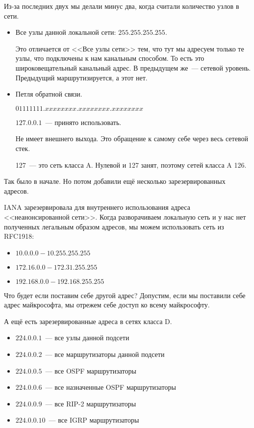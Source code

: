 Из-за последних двух мы делали минус два, когда считали количество узлов в сети.

\begin{itemize}
    \item Все узлы данной локальной сети: $255.255.255.255$.

    Это отличается от <<Все узлы сети>> тем, что тут мы адресуем только те узлы, что подключены к нам канальным способом. То есть это широковещательный канальный адрес. В предыдущем же~--- сетевой уровень. Предыдущий маршрутизируется, а этот нет.

    \item Петля обратной связи.

    $01111111.xxxxxxxx.xxxxxxxx.xxxxxxxx$

    $127.0.0.1$~--- принято использовать.

    Не имеет внешнего выхода. Это обращение к самому себе через весь сетевой стек. 

    127~--- это сеть класса A. Нулевой и 127 занят, поэтому сетей класса A 126.
\end{itemize}

Так было в начале. Но потом добавили ещё несколько зарезервированных адресов.

IANA зарезервировала для внутреннего использования адреса <<неанонсированной сети>>. Когда разворачиваем локальную сеть и у нас нет полученных легальным образом адресов, мы можем использовать сеть из RFC1918:

\begin{itemize}
    \item $10.0.0.0-10.255.255.255$
    \item $172.16.0.0-172.31.255.255$
    \item $192.168.0.0-192.168.255.255$
\end{itemize}

Что будет если поставим себе другой адрес? Допустим, если мы поставили себе адрес майкрософта, мы отрежем себе доступ ко всему майкрософту.

А ещё есть зарезервированные адреса в сетях класса D.

\begin{itemize}
    \item $224.0.0.1$~--- все узлы данной подсети
    \item $224.0.0.2$~--- все маршрутизаторы данной подсети
    \item $224.0.0.5$~--- все OSPF маршрутизаторы
    \item $224.0.0.6$~--- все назначенные OSPF маршрутизаторы
    \item $224.0.0.9$~--- все RIP-2 маршрутизаторы
    \item $224.0.0.10$~--- все IGRP маршрутизаторы
\end{itemize}


